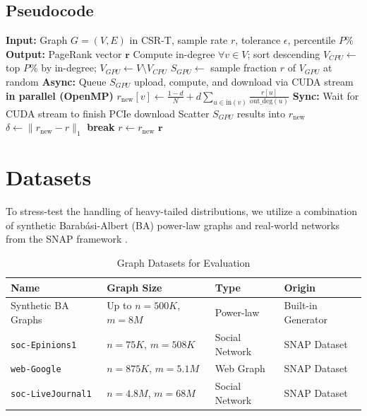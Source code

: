 \documentclass[12pt,a4paper]{article}
\begin{document}
    \subsection{Pseudocode}
    \begin{algorithm}[H]
    \caption{Stochastic Block-Jacobi Hybrid PageRank Iteration}
    \label{alg:sbj}
    \begin{algorithmic}[1]
        \State \textbf{Input:} Graph $G = (V, E)$ in CSR-T, sample rate $r$, tolerance $\epsilon$, percentile $P\%$
        \State \textbf{Output:} PageRank vector $\mathbf{r}$
        \State Compute in-degree $\forall v \in V$; sort descending
        \State $V_{CPU} \leftarrow$ top $P\%$ by in-degree; $V_{GPU} \leftarrow V \setminus V_{CPU}$
            \State $S_{GPU} \leftarrow$ sample fraction $r$ of $V_{GPU}$ at random
            \State \textbf{Async:} Queue $S_{GPU}$ upload, compute, and download via CUDA stream
             \textbf{in parallel (OpenMP)}
                \State $r_{\text{new}}[v] \leftarrow \frac{1-d}{N} + d \sum_{u \in \text{in}(v)} \frac{r[u]}{\text{out\_deg}(u)}$
            \EndFor
            \State \textbf{Sync:} Wait for CUDA stream to finish PCIe download
            \State Scatter $S_{GPU}$ results into $r_{\text{new}}$
            \State $\delta \leftarrow \lVert r_{\text{new}} - r \rVert_1$
            \If {$\delta < \epsilon$} \textbf{break} \EndIf
            \State $r \leftarrow r_{\text{new}}$
        \EndWhile
        \State \Return $\mathbf{r}$
    \end{algorithmic}
    \end{algorithm}
    
   \newpage
   \section{Datasets}
   
   To stress-test the handling of heavy-tailed distributions, we utilize a combination of synthetic Barab\'{a}si-Albert (BA) power-law graphs and real-world networks from the SNAP framework \cite{snapdatasets}. 

   \begin{longtable}[htp]{|p{3.5cm}|p{4.5cm}|p{2.5cm}|p{3.5cm}|}
	\caption{Graph Datasets for Evaluation}
	\label{Table2} \\
	\toprule \textbf{Name} & \textbf{Graph Size} & \textbf{Type} & \textbf{Origin} \\
	\midrule 
    Synthetic BA Graphs & Up to $n=500K$, $m=8M$ & Power-law & Built-in Generator \\
    \midrule 
    \texttt{soc-Epinions1} & $n=75K$, $m=508K$ & Social Network & SNAP Dataset \\
    \midrule 
    \texttt{web-Google} & $n=875K$, $m=5.1M$ & Web Graph & SNAP Dataset \\
    \midrule 
    \texttt{soc-LiveJournal1} & $n=4.8M$, $m=68M$ & Social Network & SNAP Dataset \\
	\bottomrule
	\end{longtable}
\end{document}
